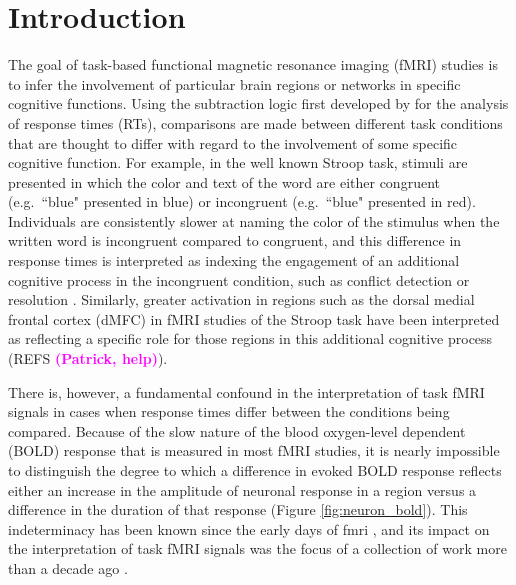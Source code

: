 \documentclass[titlepage,12pt] {article}
\newcommand{\ph}{\textcolor{magenta}{\textbf{(Patrick, help)}}}
\begin{document}
\section*{Introduction}

The goal of task-based functional magnetic resonance imaging (fMRI) studies is to infer the involvement of particular brain regions or networks in specific cognitive functions.  Using the subtraction logic first developed by \citet{donders1969} for the analysis of response times (RTs), comparisons are made between different task conditions that are thought to differ with regard to the involvement of some specific cognitive function.  For example, in the well known Stroop task, stimuli are presented in which the color and text of the word are either congruent (e.g.\ ``blue" presented in blue) or incongruent (e.g.\ ``blue" presented in red).  Individuals are consistently slower at naming the color of the stimulus when the written word is incongruent compared to congruent, and this difference in response times is interpreted as indexing the engagement of an additional cognitive process in the incongruent condition, such as conflict detection or resolution \citep{botvinick2001}. Similarly, greater activation in regions such as the dorsal medial frontal cortex (dMFC) in fMRI studies of the Stroop task have been interpreted as reflecting a specific role for those regions in this additional cognitive process (REFS \ph).  

There is, however, a fundamental confound in the interpretation of task fMRI signals in cases when response times differ between the conditions being compared. Because of the slow nature of the blood oxygen-level dependent (BOLD) response that is measured in most fMRI studies, it is nearly impossible to distinguish the degree to which a difference in evoked BOLD response reflects either an increase in the amplitude of neuronal response in a region versus a difference in the duration of that response (Figure \ref{fig:neuron_bold}).  This indeterminacy has been known since the early days of fmri \citep{savoy1995, fslbook2001}, and its impact on the interpretation of task fMRI signals was the focus of a collection of work more than a decade ago  \citep{grinband_detection_2008,  carp_conditional_2010, grinband_dorsal_2011, weissman_congruency_2013}. 
\end{document}
